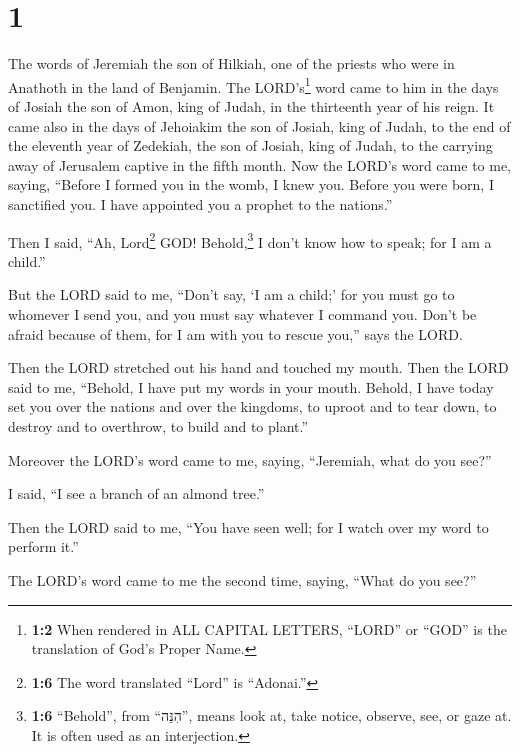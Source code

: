 \hypertarget{section}{%
\section{1}\label{section}}

 The words of Jeremiah the son of Hilkiah, one of the
priests who were in Anathoth in the land of Benjamin.  The
LORD's\footnote{\textbf{1:2} When rendered in ALL CAPITAL LETTERS,
  ``LORD'' or ``GOD'' is the translation of God's Proper Name.} word
came to him in the days of Josiah the son of Amon, king of Judah, in the
thirteenth year of his reign.  It came also in the days of
Jehoiakim the son of Josiah, king of Judah, to the end of the eleventh
year of Zedekiah, the son of Josiah, king of Judah, to the carrying away
of Jerusalem captive in the fifth month.  Now the LORD's
word came to me, saying,  ``Before I formed you in the
womb, I knew you. Before you were born, I sanctified you. I have
appointed you a prophet to the nations.''

 Then I said, ``Ah, Lord\footnote{\textbf{1:6} The word
  translated ``Lord'' is ``Adonai.''} GOD! Behold,\footnote{\textbf{1:6}
  ``Behold'', from ``הִנֵּה'', means look at, take notice, observe, see,
  or gaze at. It is often used as an interjection.} I don't know how to
speak; for I am a child.''

 But the LORD said to me, ``Don't say, `I am a child;' for
you must go to whomever I send you, and you must say whatever I command
you.  Don't be afraid because of them, for I am with you
to rescue you,'' says the LORD.

 Then the LORD stretched out his hand and touched my
mouth. Then the LORD said to me, ``Behold, I have put my words in your
mouth.  Behold, I have today set you over the nations and
over the kingdoms, to uproot and to tear down, to destroy and to
overthrow, to build and to plant.''

 Moreover the LORD's word came to me, saying, ``Jeremiah,
what do you see?''

I said, ``I see a branch of an almond tree.''

 Then the LORD said to me, ``You have seen well; for I
watch over my word to perform it.''

 The LORD's word came to me the second time, saying,
``What do you see?''

